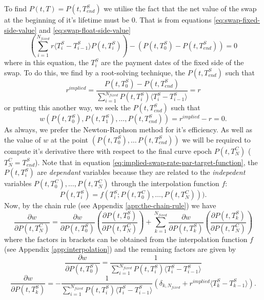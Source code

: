 \documentclass[a4paper]{article}
\begin{document}
To find $P(t, T) = P(t, T^{S}_{end})$ we utilise the fact that the net value of the swap at the beginning of it's lifetime must be $0$. That is from equations \ref{eq:swap-fixed-side-value} and \ref{eq:swap-float-side-value}
\[
  \left(\sum_{i=1}^{N_{fixed}}r\langle T^{S}_{i}-T^{S}_{i-1}\rangle P(t, T^{S}_{i})\right) - \left(P(t, T^{S}_{0}) - P(t, T^{S}_{end})\right) = 0
\] where in this equation, the $T^{S}_{i}$ are the payment dates of the fixed side of the swap. To do this, we find by a root-solving technique, the $P(t, T^{S}_{end})$ such that
\begin{equation}
  r^{implied} = \frac{P(t, T^{S}_{0})-P(t, T^{S}_{end})}{\sum_{i=1}^{N_{fixed}}P(t, T^{S}_{i})\langle T^{S}_{i}-T^{S}_{i-1} \rangle} = r \label{eq:implied-swap-rate-par}
\end{equation} or putting this another way, we seek the $P(t, T^{S}_{end})$ such that
\begin{equation}
  w(P(t, T^{S}_{0}), P(t, T^{S}_{1}), \ldots, P(t, T^{S}_{end})) = r^{implied} - r = 0. \label{eq:implied-swap-rate-par-target-function}
\end{equation}
As always, we prefer the Newton-Raphson method for it's efficiency. As well as the value of $w$ at the point $(P(t, T^{S}_{0}), \ldots\, P(t, T^{S}_{end}))$ we will be required to compute it's derivative there with respect to the final curve epoch $P(t, T^{C}_{N})$ ($T^{C}_{N} = T^{S}_{end}$). Note that in equation \ref{eq:implied-swap-rate-par-target-function}, the $P(t, T^{S}_{i})$ are \emph{dependant} variables because they are related to the \emph{indepedent} variables $P(t, T^{C}_{0}),\ldots, P(t, T^{C}_{N})$ through the interpolation function $f$:
\begin{equation}
  P(t, T^{S}_{i}) = f(T^{S}_{i}; P(t, T^{C}_{0}), \ldots, P(t, T^{C}_{N}))).
\end{equation}
Now, by the chain rule (see Appendix \ref{app:the-chain-rule}) we have
\begin{equation}
  \frac{\partial{w}}{\partial{P(t, T^{C}_{N})}} 
  = \frac{\partial{w}}{\partial{P(t, T^{S}_0)}}\left(\frac{\partial{P(t, T^{S}_{0})}}{\partial{P(t, T^{C}_{N})}}\right) +
  \sum_{k=1}^{N_{fixed}}\frac{\partial{w}}{\partial{P(t, T^{S}_{k})}}\left(\frac{\partial{P(t, T^{S}_{k})}}{\partial{P(t, T^{C}_{N})}}\right)
\end{equation} where the factors in brackets can be obtained from the interpolation function $f$ (see Appendix \ref{app:interpolation}) and the remaining factors are given by
\begin{equation}
  \frac{\partial{w}}{\partial{P(t, T^{S}_{0})}}  = \frac{1}{\sum_{i=1}^{N_{fixed}}P(t, T^{S}_{i})\langle T^{S}_{i}-T^{S}_{i-1}\rangle}
\end{equation}
\begin{equation}
  \frac{\partial{w}}{\partial{P(t, T^{S}_{k})}} = -\frac{1}{\sum_{i=1}^{N_{fixed}}P(t, T^{S}_{i})\langle T^{S}_{i}-T^{S}_{i-1}\rangle}\left(\delta_{k, N_{fixed}}+ r^{implied}\langle T^S_{k}-T^{S}_{k-1}\rangle\right).
\end{equation}
\end{document}
